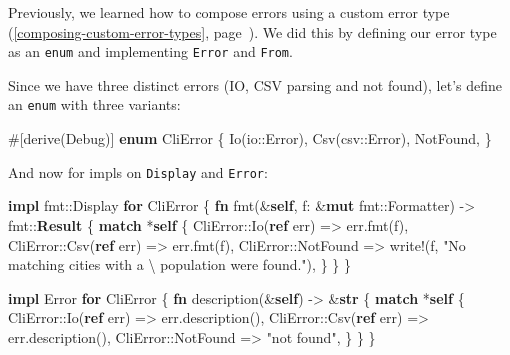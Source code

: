 \documentclass[a4paper,]{book}
\renewcommand*{\hyperref}[2][\ar]{%
  \def\ar{#2}%
  #2 (\autoref{#1}, page~\pageref{#1})}
\newenvironment{Shaded}{\begin{snugshade}}{\end{snugshade}}
\newcommand{\KeywordTok}[1]{\textcolor[rgb]{0.13,0.29,0.53}{\textbf{{#1}}}}
\newcommand{\StringTok}[1]{\textcolor[rgb]{0.31,0.60,0.02}{{#1}}}
\newcommand{\OtherTok}[1]{\textcolor[rgb]{0.56,0.35,0.01}{{#1}}}
\newcommand{\NormalTok}[1]{{#1}}
\begin{document}

Previously, we learned how to
\hyperref[composing-custom-error-types]{compose errors using a custom
error type}. We did this by defining our error type as an \texttt{enum}
and implementing \texttt{Error} and \texttt{From}.

Since we have three distinct errors (IO, CSV parsing and not found),
let's define an \texttt{enum} with three variants:

\begin{Shaded}
\begin{Highlighting}[]
\OtherTok{#[}\NormalTok{derive}\OtherTok{(}\NormalTok{Debug}\OtherTok{)]}
\KeywordTok{enum} \NormalTok{CliError \{}
    \NormalTok{Io(io::Error),}
    \NormalTok{Csv(csv::Error),}
    \NormalTok{NotFound,}
\NormalTok{\}}
\end{Highlighting}
\end{Shaded}

And now for impls on \texttt{Display} and \texttt{Error}:

\begin{Shaded}
\begin{Highlighting}[]
\KeywordTok{impl} \NormalTok{fmt::Display }\KeywordTok{for} \NormalTok{CliError \{}
    \KeywordTok{fn} \NormalTok{fmt(&}\KeywordTok{self}\NormalTok{, f: &}\KeywordTok{mut} \NormalTok{fmt::Formatter) -> fmt::}\KeywordTok{Result} \NormalTok{\{}
        \KeywordTok{match} \NormalTok{*}\KeywordTok{self} \NormalTok{\{}
            \NormalTok{CliError::Io(}\KeywordTok{ref} \NormalTok{err) => err.fmt(f),}
            \NormalTok{CliError::Csv(}\KeywordTok{ref} \NormalTok{err) => err.fmt(f),}
            \NormalTok{CliError::NotFound => }\OtherTok{write!}\NormalTok{(f, }\StringTok{"No matching cities with a \textbackslash{}}
\StringTok{                                             population were found."}\NormalTok{),}
        \NormalTok{\}}
    \NormalTok{\}}
\NormalTok{\}}

\KeywordTok{impl} \NormalTok{Error }\KeywordTok{for} \NormalTok{CliError \{}
    \KeywordTok{fn} \NormalTok{description(&}\KeywordTok{self}\NormalTok{) -> &}\KeywordTok{str} \NormalTok{\{}
        \KeywordTok{match} \NormalTok{*}\KeywordTok{self} \NormalTok{\{}
            \NormalTok{CliError::Io(}\KeywordTok{ref} \NormalTok{err) => err.description(),}
            \NormalTok{CliError::Csv(}\KeywordTok{ref} \NormalTok{err) => err.description(),}
            \NormalTok{CliError::NotFound => }\StringTok{"not found"}\NormalTok{,}
        \NormalTok{\}}
    \NormalTok{\}}
\NormalTok{\}}
\end{Highlighting}
\end{Shaded}
\end{document}
